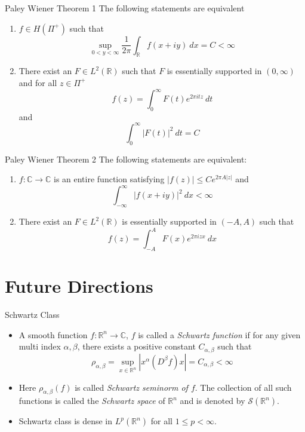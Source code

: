 \documentclass[compress]{beamer}
\newcommand{\R}{\mathbb R}
\newcommand{\C}{\mathbb C}
\begin{document}
\begin{frame}{Paley Wiener Theorem 1}
  The following statements are equivalent
  \begin{enumerate}
    \item $f \in H(\Pi^+)$ such that $$\sup_{0<y<\infty} \frac{1}{2\pi}\int_\R f(x+iy) \ dx = C < \infty$$
    \item There exist an $F \in L^2(\R)$ such that $F$ is essentially supported in $(0, \infty)$ and for all $z \in \Pi^+$ $$f(z) = \int_0^\infty F(t) e^{2\pi it z} \ dt$$
      and $$\int_0^\infty |F(t)|^2 \ dt = C$$
  \end{enumerate}
\end{frame}

\begin{frame}{Paley Wiener Theorem 2}
    The following statements are equivalent:
      \begin{enumerate}
        \item $f: \C \to \C$ is an entire function satisfying $|f(z)| \le Ce^{2\pi A |z|}$ and $$\int_{-\infty}^\infty |f(x+iy)|^2 \ dx < \infty$$
        \item There exist an $F \in L^2(\R)$ is essentially supported in $(-A, A)$ such that $$f(z) = \int_{-A}^A F(x) e^{2\pi iz x} \ dx$$
      \end{enumerate}
\end{frame}


\section{Future Directions}

\begin{frame}{Schwartz Class}
  \begin{itemize}
    \item A smooth function $f:\mathbb{R}^n \to \mathbb{C}$, $f$ is called a \emph{Schwartz function} if for any given multi index $\alpha, \beta$, there exists a positive constant $C_{\alpha, \beta}$ such that $$\rho_{\alpha, \beta} = \sup_{x \in \mathbb{R}^n} \left|x^\alpha (D^\beta f)x \right| = C_{\alpha, \beta} < \infty$$
    \item Here $\rho_{\alpha, \beta}(f)$ is called \emph{Schwartz seminorm of $f$}. The collection of all such functions is called the \emph{Schwartz space} of $\mathbb{R}^n$ and is denoted by $\mathscr{S}(\mathbb{R}^n)$.
    \item Schwartz class is dense in $L^p(\R^n)$ for all $1\le p < \infty$.
  \end{itemize}
\end{frame}
\end{document}
